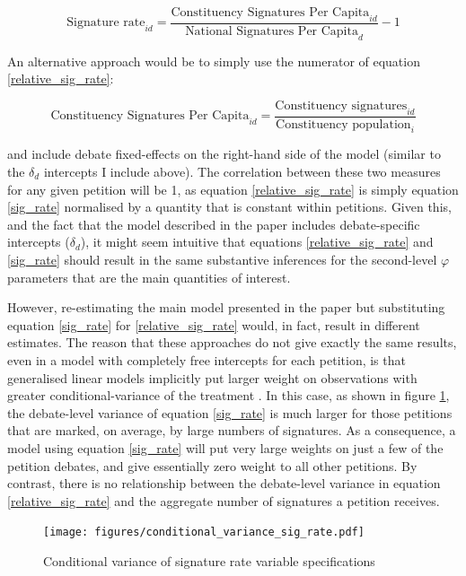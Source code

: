 \documentclass[12pt]{article}
\begin{document}
\begin{equation}\label{relative_sig_rate}
\text{Signature rate}_{id} = \frac{\text{Constituency Signatures Per Capita}_{id}}{\text{National Signatures Per Capita}_d} - 1
\end{equation}

An alternative approach would be to simply use the numerator of equation \ref{relative_sig_rate}:

\begin{equation}\label{sig_rate}
\text{Constituency Signatures Per Capita}_{id} = \frac{\text{Constituency signatures}_{id}}{\text{Constituency population}_{i}}
\end{equation}

\noindent and include debate fixed-effects on the right-hand side of the model (similar to the $\delta_d$ intercepts I include above). The correlation between these two measures for any given petition will be 1, as equation \ref{relative_sig_rate} is simply equation \ref{sig_rate} normalised by a quantity that is constant within petitions. Given this, and the fact that the model described in the paper includes debate-specific intercepts ($\delta_d$), it might seem intuitive that equations \ref{relative_sig_rate} and \ref{sig_rate} should result in the same substantive inferences for the second-level $\varphi$ parameters that are the main quantities of interest. 

However, re-estimating the main model presented in the paper but substituting equation \ref{sig_rate} for \ref{relative_sig_rate} would, in fact, result in different estimates. The reason that these approaches do not give exactly the same results, even in a model with completely free intercepts for each petition, is that generalised linear models implicitly put larger weight on observations with greater conditional-variance of the treatment \citep{aronow2016does}. In this case, as shown in figure \ref{fig:cond_var}, the debate-level variance of equation \ref{sig_rate} is much larger for those petitions that are marked, on average, by large numbers of signatures. As a consequence, a model using equation \ref{sig_rate} will put very large weights on just a few of the petition debates, and give essentially zero weight to all other petitions. By contrast, there is no relationship between the debate-level variance in equation \ref{relative_sig_rate} and the aggregate number of signatures a petition receives. 

\begin{figure}[h]
\begin{center}\caption{Conditional variance of signature rate variable specifications}\label{fig:cond_var}
\texttt{[image: figures/conditional\_variance\_sig\_rate.pdf]}
\end{center}
\end{figure}
\end{document}

